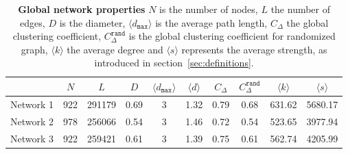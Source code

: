 \begin{table}[htb]
\centering
\caption[Global network properties]{\textbf{Global network properties} $N$ is the number of nodes, $L$ the number of edges, $D$ is the diameter, $\langle d_{\texttt{max}} \rangle$ is the average path length, $C_\Delta$ the global clustering coefficient, $C_{\Delta}^\texttt{rand}$ is the global clustering coefficient for randomized graph, $\langle k \rangle$ the average degree and $\langle s \rangle$ represents the average strength, as introduced in section~\ref{sec:definitions}.}
\label{tab:stats}
\vspace*{5mm}
\begin{tabularx}{\textwidth}{lccccccccc}
\toprule
{} &  $N$ &   $L$ &  $D$ &  $\langle d_{\texttt{max}} \rangle$ &  $\langle d \rangle$ &   $C_\Delta$ &  $C_{\Delta}^\texttt{rand}$ & $\langle k \rangle$ &  $\langle s \rangle$ \\
\midrule
Network 1 &    922 &  291179 &     0.69 &         3 &              1.32 &  0.79 & 0.68 &      631.62 &      5680.17 \\
Network 2 &    978 &  256066 &     0.54 &         3 &              1.46 &  0.72 & 0.54 &      523.65 &      3977.94 \\
Network 3 &    922 &  259421 &     0.61 &         3 &              1.39 &  0.75 & 0.61 &      562.74 &      4205.99 \\
\bottomrule
\end{tabularx}
\end{table}